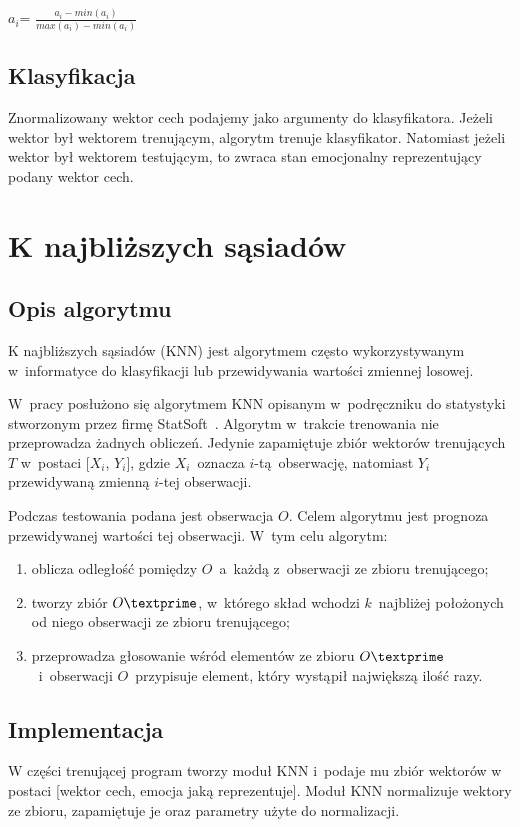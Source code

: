 \documentclass[declaration,shortabstract]{iithesis}
\begin{document}
$a_i$\textprime = $\frac{a_i - min(a_i)}{max(a_i) - min(a_i)}$

\section{Klasyfikacja}
Znormalizowany wektor cech podajemy jako argumenty do klasyfikatora. Jeżeli wektor był wektorem trenującym, algorytm trenuje klasyfikator. Natomiast jeżeli wektor był wektorem testującym, to zwraca stan emocjonalny reprezentujący podany wektor cech.

\chapter{K najbliższych sąsiadów}
\section{Opis algorytmu}
K najbliższych sąsiadów (KNN) jest algorytmem często wykorzystywanym w~informatyce do klasyfikacji lub przewidywania wartości zmiennej losowej.  

W~pracy posłużono się algorytmem KNN opisanym w~podręczniku do statystyki stworzonym przez firmę StatSoft~\cite{KNN_Wstep}.
Algorytm w~trakcie trenowania nie przeprowadza żadnych obliczeń. Jedynie zapamiętuje zbiór wektorów trenujących $T$ w~postaci [$X_i$, $Y_i$], gdzie $X_i$~oznacza $i$-tą~obserwację, natomiast $Y_i$ przewidywaną zmienną $i$-tej obserwacji.

Podczas testowania podana jest obserwacja $O$. Celem algorytmu jest prognoza przewidywanej wartości tej obserwacji. W~tym celu algorytm:
\begin{enumerate}
\item oblicza odległość pomiędzy $O$~a~każdą z~obserwacji ze zbioru trenującego;
\item tworzy zbiór $O\textprime$, w~którego skład wchodzi $k$~najbliżej położonych od niego obserwacji ze zbioru trenującego;
\item przeprowadza głosowanie wśród elementów ze zbioru $O\textprime$~i~obserwacji $O$~przypisuje element, który wystąpił największą ilość razy.
\end{enumerate}

\section{Implementacja}
W części trenującej program tworzy moduł KNN i~podaje mu zbiór wektorów w postaci [wektor cech, emocja jaką reprezentuje]. Moduł KNN normalizuje wektory ze zbioru, zapamiętuje je oraz parametry użyte do normalizacji.
\end{document}
